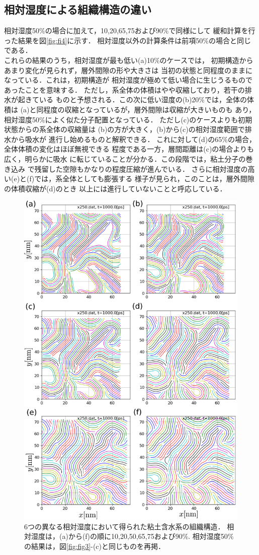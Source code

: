 \subsection{相対湿度による組織構造の違い}
相対湿度50$\%$の場合に加えて，10,20,65,75および90$\%$で同様にして
緩和計算を行った結果を図\ref{fig:fi4}に示す．
相対湿度以外の計算条件は前項50$\%$の場合と同じである．\\
これらの結果のうち，相対湿度が最も低い(a)10$\%$のケースでは，
初期構造からあまり変化が見られず，層外間隙の形や大きさは
当初の状態と同程度のままになっている．これは，初期構造が
相対湿度が極めて低い場合に生じうるものであったことを意味する．
ただし，系全体の体積はやや収縮しており，若干の排水が起きている
ものと予想される．この次に低い湿度の(b)20$\%$では，全体の体積は
(a)と同程度の収縮となっているが，層外間隙は収縮が大きいものも
あり，相対湿度50$\%$によく似た分子配置となっている．
ただし(c)のケースよりも初期状態からの系全体の収縮量は
(b)の方が大きく，(b)から(c)の相対湿度範囲で排水から吸水が
進行し始めるものと解釈できる．
これに対して(d)の65$\%$の場合，全体体積の変化はほぼ無視できる
程度である一方，層間距離は(c)の場合よりも広く，明らかに吸水
に転じていることが分かる．この段階では，粘土分子の巻き込み
で残留した空隙もかなりの程度圧縮が進んでいる．
さらに相対湿度の高い(e)と(f)では，系全体としても膨張する
様子が見られ，このことは，層外間隙の体積収縮が(d)のとき
以上には進行していないことと呼応している．
\begin{figure}[h]
	\begin{center}
	\includegraphics[width=0.8\linewidth]{Figs/fig4.pdf} 
	\end{center}
	\caption{
		6つの異なる相対湿度において得られた粘土含水系の組織構造．
		相対湿度は，(a)から(f)の順に10,20,50,65,75および90$\%$. 
		相対湿度50$\%$の結果は，図\ref{fig:fig3}-(c)と同じものを再掲．
	} 
	\label{fig:fig4}
\end{figure}
